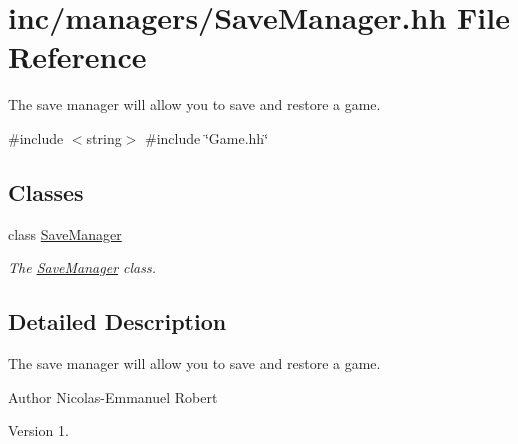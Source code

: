 \hypertarget{SaveManager_8hh}{}\section{inc/managers/\+Save\+Manager.hh File Reference}
\label{SaveManager_8hh}


The save manager will allow you to save and restore a game.  


{\ttfamily \#include $<$string$>$}\newline
{\ttfamily \#include \char`\"{}Game.\+hh\char`\"{}}\newline
\subsection*{Classes}
\begin{DoxyCompactItemize}
\item 
class \hyperlink{classSaveManager}{Save\+Manager}
\begin{DoxyCompactList}\small\item\em The \hyperlink{classSaveManager}{Save\+Manager} class. \end{DoxyCompactList}\end{DoxyCompactItemize}


\subsection{Detailed Description}
The save manager will allow you to save and restore a game. 

\begin{DoxyAuthor}{Author}
Nicolas-\/\+Emmanuel Robert 
\end{DoxyAuthor}
\begin{DoxyVersion}{Version}
1. 
\end{DoxyVersion}
